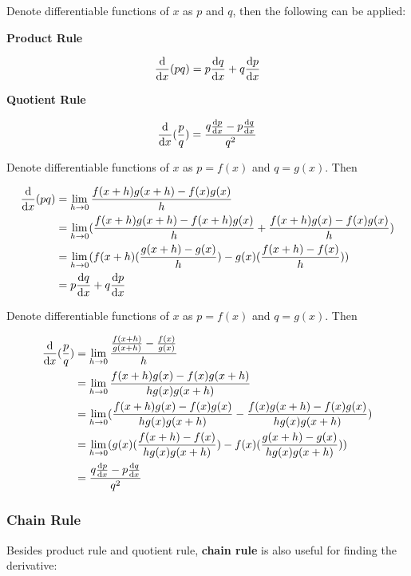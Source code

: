 \documentclass[a4paper,12pt]{article}
\begin{document}
\begin{thm}
  Denote differentiable functions of $x$ as $p$ and $q$, then the following can be applied:

  \begin{alist}
    \item \textbf{Product Rule}

    $$\frac{\mathrm{d} }{\mathrm{d}  x}(pq)=p\frac{\mathrm{d}  q}{\mathrm{d}  x}+q\frac{\mathrm{d}  p}{\mathrm{d}  x}$$

    \item \textbf{Quotient Rule}

    $$\frac{\mathrm{d} }{\mathrm{d}  x}(\frac{p}{q})=\frac{q\frac{\mathrm{d}  p}{\mathrm{d}  x}-p\frac{\mathrm{d}  q}{\mathrm{d}  x}}{q^{2}}$$
  \end{alist}

   Denote differentiable functions of $x$ as $p=f(x)$ and $q=g(x)$. Then

  $$\begin{aligned}[t]
    \frac{\mathrm{d} }{\mathrm{d}  x}(pq)&=\lim_{h\to 0}\frac{f(x+h)g(x+h)-f(x)g(x)}{h}\\
    &=\lim_{h\to 0}(\frac{f(x+h)g(x+h)-f(x+h)g(x)}{h}+\frac{f(x+h)g(x)-f(x)g(x)}{h})\\
    &=\lim_{h\to 0}(f(x+h)(\frac{g(x+h)-g(x)}{h})-g(x)(\frac{f(x+h)-f(x)}{h}))\\
    &=p\frac{\mathrm{d}  q}{\mathrm{d}  x}+q\frac{\mathrm{d}  p}{\mathrm{d}  x}
  \end{aligned}$$\s

   Denote differentiable functions of $x$ as $p=f(x)$ and $q=g(x)$. Then

  $$\begin{aligned}[t]
    \frac{\mathrm{d} }{\mathrm{d}  x}(\frac{p}{q})&=\lim_{h\to 0}\frac{\frac{f(x+h)}{g(x+h)}-\frac{f(x)}{g(x)}}{h}\\
    &=\lim_{h\to 0}\frac{f(x+h)g(x)-f(x)g(x+h)}{hg(x)g(x+h)}\\
    &=\lim_{h\to 0}(\frac{f(x+h)g(x)-f(x)g(x)}{hg(x)g(x+h)}-\frac{f(x)g(x+h)-f(x)g(x)}{hg(x)g(x+h)})\\
    &=\lim_{h\to 0}(g(x)(\frac{f(x+h)-f(x)}{hg(x)g(x+h)})-f(x)(\frac{g(x+h)-g(x)}{hg(x)g(x+h)}))\\
    &=\frac{q\frac{\mathrm{d}  p}{\mathrm{d}  x}-p\frac{\mathrm{d}  q}{\mathrm{d}  x}}{q^{2}}
  \end{aligned}$$
\end{thm}

\subsubsection{Chain Rule}
Besides product rule and quotient rule, \textbf{chain rule} is also useful for finding the derivative:\n
\end{document}
